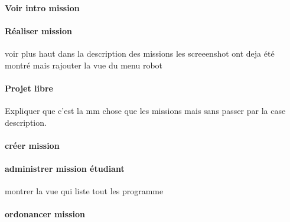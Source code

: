 \paragraph{Voir intro mission}

\paragraph{Réaliser mission} voir plus haut dans la description des missions les screeenshot ont deja été montré mais rajouter la vue du menu robot

\paragraph{Projet libre}
Expliquer que c'est la mm chose que les missions mais sans passer par la case description.

\paragraph{créer mission}

\paragraph{administrer mission étudiant} montrer la vue qui liste tout les programme

\paragraph{ordonancer mission}

